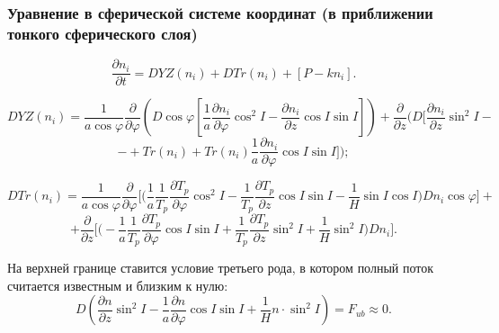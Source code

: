 \documentclass[9pt, apectratio=43,unicode]{beamer}
\begin{document}
\begin{frame}\frametitle{Уравнение в сферической системе координат (в приближении тонкого сферического слоя)}

$$\dfrac{\partial n_i}{\partial t} = DYZ(n_i)+DTr(n_i)+[P-kn_i].$$

$$DYZ(n_i) = \dfrac{1}{a\cos\varphi}\dfrac{\partial}{\partial\varphi}\left(D\cos\varphi\left[\dfrac{1}{a}\dfrac{\partial n_i}{\partial\varphi} \cos^2 I -\dfrac{\partial n_i}{\partial z}\cos I\sin I\right]\right)+ \dfrac{\partial}{\partial z}\bigg(D\bigg[\dfrac{\partial n_i}{\partial z}\sin^2 I -$$ $$- +Tr(n_i)+Tr(n_i)\dfrac{1}{a}\dfrac{\partial n_i}{\partial\varphi}\cos I \sin I\bigg]\bigg);$$ 

$$DTr(n_i) = \dfrac{1}{a\cos\varphi}\dfrac{\partial}{\partial \varphi}\bigg[\bigg(\dfrac{1}{a}\dfrac{1}{T_p}\dfrac{\partial T_p}{\partial\varphi}\cos^2 I-\dfrac{1}{T_p}\dfrac{\partial T_p}{\partial z}\cos I \sin I - \dfrac{1}{H}\sin I \cos I\bigg)Dn_i\cos\varphi\bigg] +$$ $$+ \dfrac{\partial}{\partial z}\bigg[\bigg(-\dfrac{1}{a}\dfrac{1}{T_p}\dfrac{\partial T_p}{\partial \varphi}\cos I \sin I +\dfrac{1}{T_p}\dfrac{\partial T_p}{\partial z}\sin^2 I+\dfrac{1}{H}\sin^2I\bigg)Dn_i\bigg].$$


На верхней границе ставится условие третьего рода, в котором полный поток считается известным и близким к нулю:
$$D\left(\dfrac{\partial n}{\partial z} \sin^2 I - \dfrac{1}{a}\dfrac{\partial n}{\partial \varphi} \cos I \sin I + \dfrac{1}{H} n \cdot \sin^2 I\right) = F_{ub} \approx 0.$$
\end{frame}
\end{document}
